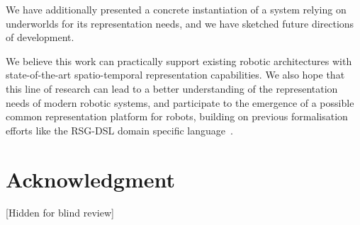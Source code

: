 \documentclass[conference]{IEEEtran}
\newcommand{\uwds}{{\sc underworlds}\xspace}
\begin{document}
We have additionally presented a concrete instantiation of a system relying on \uwds
for its representation needs, and we have sketched future directions of
development.

We believe this work can practically support existing robotic architectures with
state-of-the-art spatio-temporal representation capabilities. We also hope that
this line of research can lead to a better understanding of the representation
needs of modern robotic systems, and participate to the emergence of a possible
common representation platform for robots, building on previous formalisation
efforts like the RSG-DSL domain specific language~\cite{blumenthal2014towards}.

\section*{Acknowledgment}



[Hidden for blind review]



\end{document}
